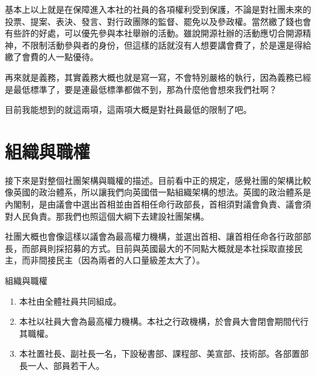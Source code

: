 \documentclass[12pt, a4paper]{NGPLB}
\begin{document}
基本上以上就是在保障進入本社的社員的各項權利受到保護，不論是對社團未來的投票、提案、表決、發言、對行政團隊的監督、罷免以及參政權。當然繳了錢也會有些許的好處，可以優先參與本社舉辦的活動。雖說開源社辦的活動應切合開源精神，不限制活動參與者的身份，但這樣的話就沒有人想要講會費了，於是還是得給繳了會費的人一點優待。

再來就是義務，其實義務大概也就是寫一寫，不會特別嚴格的執行，因為義務已經是最低標準了，要是連最低標準都做不到，那為什麼他會想來我們社啊？




目前我能想到的就這兩項，這兩項大概是對社員最低的限制了吧。

\chapter{組織與職權}

接下來是對整個社團架構與職權的描述。目前看中正的規定，感覺社團的架構比較像英國的政治體系，所以讓我們向英國借一點組織架構的想法。英國的政治體系是內閣制，是由議會中選出首相並由首相任命行政部長，首相須對議會負責、議會須對人民負責。那我們也照這個大綱下去建設社團架構。

社團大概也會像這樣以議會為最高權力機構，並選出首相、讓首相任命各行政部部長，而部員則採招募的方式。目前與英國最大的不同點大概就是本社採取直接民主，而非間接民主（因為兩者的人口量級差太大了）。


\begin{mylisting}
\item 組織與職權
\begin{enumerate}
\item 本社由全體社員共同組成。
\item 本社以社員大會為最高權力機構。本社之行政機構，於會員大會閉會期間代行其職權。
\item 本社置社長、副社長一名，下設秘書部、課程部、美宣部、技術部。各部置部長一人、部員若干人。
\end{enumerate}
\end{mylisting}
\end{document}

